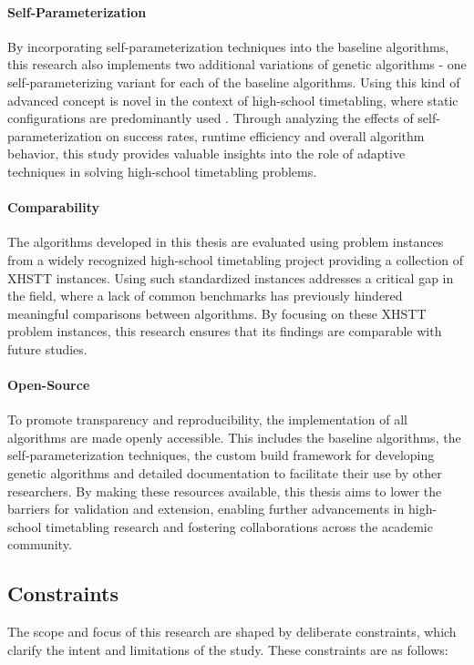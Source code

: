 \documentclass[english,examples]{isasthesis}
\begin{document}
\paragraph{Self-Parameterization}
By incorporating self-parameterization techniques into the baseline algorithms,
this research also implements two additional variations of genetic algorithms -
one self-parameterizing variant for each of the baseline algorithms.
Using this kind of advanced concept is novel in the context of high-school
timetabling, where static configurations are predominantly used
\cite{Katoch2021,quaer2024survey}.
Through analyzing the effects of self-parameterization on success rates,
runtime efficiency and overall algorithm behavior, this study provides valuable
insights into the role of adaptive techniques in solving high-school
timetabling problems.

\paragraph{Comparability}
The algorithms developed in this thesis are evaluated using problem instances
from a widely recognized high-school timetabling project providing a collection
of XHSTT instances. Using such standardized instances addresses a critical
gap in the field, where a lack of common benchmarks has previously hindered
meaningful comparisons between algorithms. By focusing on these XHSTT problem
instances, this research ensures that its findings are comparable with future
studies.

\paragraph{Open-Source}
To promote transparency and reproducibility, the implementation of all
algorithms are made openly accessible. This includes the baseline algorithms,
the self-parameterization techniques, the custom build framework for developing
genetic algorithms and detailed documentation to facilitate their use
by other researchers. By making these resources available, this thesis aims to
lower the barriers for validation and extension, enabling further advancements
in high-school timetabling research and fostering collaborations across the
academic community.

\subsection{Constraints}
The scope and focus of this research are shaped by deliberate constraints,
which clarify the intent and limitations of the study. These constraints are as
follows:
\end{document}
